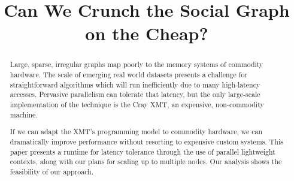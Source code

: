 \documentclass[10pt,nocopyrightspace,preprint]{sigplanconf}
\begin{document}
\renewcommand{\baselinestretch}{0.9}

\title{Can We Crunch the Social Graph on the Cheap?}



\maketitle

\begin{abstract}
  Large, sparse, irregular graphs map poorly to the memory systems of
  commodity hardware. The scale of emerging real world datasets
  presents a challenge for straightforward algorithms which will run
  inefficiently due to many high-latency accesses.  Pervasive
  parallelism can tolerate that latency, but the only large-scale
  implementation of the technique is the Cray XMT, an expensive,
  non-commodity machine.

  If we can adapt the XMT's programming model to commodity hardware,
  we can dramatically improve performance without resorting to
  expensive custom systems. This paper presents a runtime for latency
  tolerance through the use of parallel lightweight contexts, along
  with our plans for scaling up to multiple nodes. Our analysis shows
  the feasibility of our approach.
\end{abstract}
\end{document}
